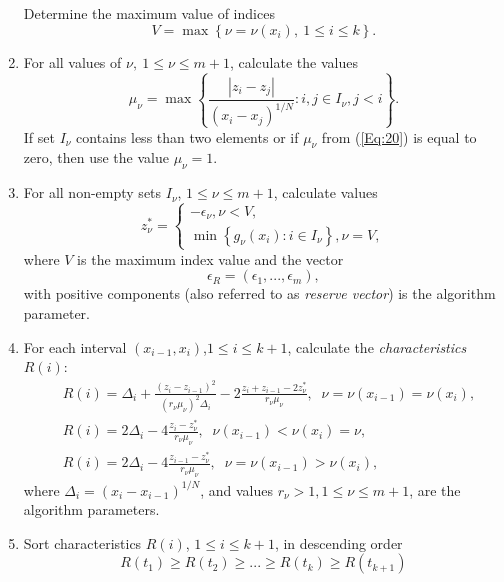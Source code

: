 \documentclass[
11pt,%
tightenlines,%
twoside,%
onecolumn,%
nofloats,%
nobibnotes,%
nofootinbib,%
superscriptaddress,%
noshowpacs,%
centertags]%
{revtex4}
\begin{document}
\begin{enumerate}
Determine the maximum value of indices
\begin{equation}\label{Eq:19}
V=\max \left\{\nu = \nu(x_i), \ 1\leq i \leq k\right\}.
\end{equation}
\item
For all values of $\nu, \ 1\leq \nu \leq m+1$, calculate the values
\begin{equation}\label{Eq:20}
\mu_\nu = \max \left\{ \frac{\left|z_i-z_j\right|}{\left(x_i-x_j\right)^{1/N}} : i,j \in I_\nu, j<i\right\}.
\end{equation}
If set $I_\nu$ contains less than two elements or if $\mu_\nu$ from (\ref{Eq:20}) is equal to zero, then use the value $\mu_\nu=1$.
\item
For all non-empty sets $I_\nu$, $1 \leq \nu \leq m+1$, calculate values
\begin{equation}\label{Eq:21}
  z^\ast_\nu =
   \begin{cases}
    -\epsilon_\nu,  \nu < V, \\
    \min{\left\{g_\nu(x_i):i\in I_\nu\right\}}, \nu = V,
   \end{cases}
\end{equation}
where $V$ is the maximum index value and the vector
\begin{equation}\label{Eq:22}
\epsilon _R=\left(\epsilon_1,...,\epsilon_m\right),
\end{equation}
with positive components (also referred to as \textit{reserve vector}) is the algorithm parameter.
\item
For each interval $(x_{i-1},x_i)$,$1 \leq i \leq k+1$, calculate the \textit{characteristics} $R(i)$:
\begin{eqnarray}\label{R}
&R(i)=\Delta_i+ \frac{(z_i-z_{i-1})^2}{(r_\nu\mu_\nu)^2\Delta_i}-2\frac{z_i+z_{i-1}-2z^\ast_\nu}{r_\nu\mu_\nu},\;\; \nu=\nu(x_{i-1})=\nu(x_i),\nonumber \\
&R(i)= 2\Delta_i-4\frac{z_i-z^\ast_\nu}{r_\nu\mu_\nu},\;\; \nu(x_{i-1})<\nu(x_i)=\nu,\\
&R(i)= 2\Delta_i-4\frac{z_{i-1}-z^\ast_\nu}{r_\nu\mu_\nu},\;\; \nu = \nu(x_{i-1})>\nu(x_i),\nonumber
\end{eqnarray}
where $\Delta_i=(x_i-x_{i-1})^{1/N}$, and values $r_\nu>1, 1\leq\nu\leq m+1$, are the algorithm parameters.
\item
Sort characteristics $R(i)$, $1\leq i \leq k+1$, in descending order
\begin{equation}\label{Eq:23}
R(t_1)\geq R(t_2)\geq ... \geq R(t_{k})\geq R(t_{k+1})
\end{equation}

\end{enumerate}
\end{document}
